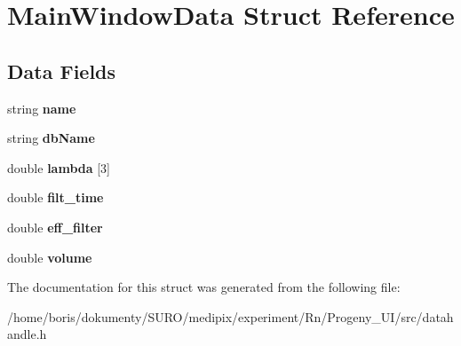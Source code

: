 \hypertarget{structMainWindowData}{\section{Main\-Window\-Data Struct Reference}
\label{structMainWindowData}
}
\subsection*{Data Fields}
\begin{DoxyCompactItemize}
\item 
\hypertarget{structMainWindowData_a13e994aac6efee77384aadf76389582c}{string {\bfseries name}}\label{structMainWindowData_a13e994aac6efee77384aadf76389582c}

\item 
\hypertarget{structMainWindowData_a3a1ed9bff4936fc9560c58c9d7cee92b}{string {\bfseries db\-Name}}\label{structMainWindowData_a3a1ed9bff4936fc9560c58c9d7cee92b}

\item 
\hypertarget{structMainWindowData_a1ad60e01af91667077554f87680a3c85}{double {\bfseries lambda} \mbox{[}3\mbox{]}}\label{structMainWindowData_a1ad60e01af91667077554f87680a3c85}

\item 
\hypertarget{structMainWindowData_a3fbc2c6f48e91f8db2b6115398ef4dde}{double {\bfseries filt\-\_\-time}}\label{structMainWindowData_a3fbc2c6f48e91f8db2b6115398ef4dde}

\item 
\hypertarget{structMainWindowData_aed7b2a7e280cf3fd1ff1195034b6f085}{double {\bfseries eff\-\_\-filter}}\label{structMainWindowData_aed7b2a7e280cf3fd1ff1195034b6f085}

\item 
\hypertarget{structMainWindowData_ac3b16f98ddcb0bf66df80b8a9d3b60b5}{double {\bfseries volume}}\label{structMainWindowData_ac3b16f98ddcb0bf66df80b8a9d3b60b5}

\end{DoxyCompactItemize}


The documentation for this struct was generated from the following file\-:\begin{DoxyCompactItemize}
\item 
/home/boris/dokumenty/\-S\-U\-R\-O/medipix/experiment/\-Rn/\-Progeny\-\_\-\-U\-I/src/datahandle.\-h\end{DoxyCompactItemize}
